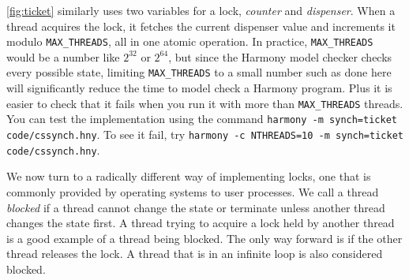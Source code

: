 \documentclass{report}
\begin{document}
\autoref{fig:ticket} similarly uses two variables for a lock,
\textit{counter} and \textit{dispenser}.  When a thread acquires the
lock, it fetches the current dispenser value and increments it
modulo \texttt{MAX\_THREADS}, all in one atomic operation.
In practice, \texttt{MAX\_THREADS} would
be a number like $2^{32}$ or $2^{64}$, but since the Harmony model checker
checks every possible state, limiting \texttt{MAX\_THREADS}
to a small number such as done
here will significantly reduce the time to model check a Harmony program.
Plus it is easier to check that it fails when you run it with more than
\texttt{MAX\_THREADS} threads.
You can test the implementation using the command
\texttt{harmony -m synch=ticket code/cssynch.hny}.
To see it fail, try
\texttt{harmony -c NTHREADS=10 -m synch=ticket code/cssynch.hny}.

%

We now turn to a radically different way of implementing locks, one
that is commonly provided by operating systems to user processes.
We call a thread \emph{blocked}
%
if a thread cannot change the state or terminate unless
another thread changes the state first.
A thread trying to acquire a lock held by another thread is a good example
of a thread being blocked.
The only way forward is if the other thread releases the lock.
A thread that is in an infinite loop is also considered blocked.
\end{document}
